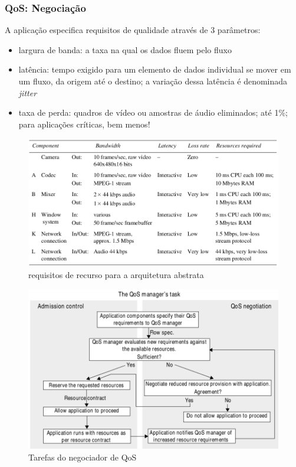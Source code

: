 \documentclass[]{beamer}
\begin{document}
\begin{frame}
  \frametitle{QoS: Negociação}
A aplicação especifica requisitos de qualidade através de 3 parâmetros: 
\begin{itemize}
  \item largura de banda: a taxa na qual os dados fluem pelo fluxo
  \item latência: tempo exigido para um elemento de dados individual se mover
em um fluxo, da origem até o destino; a variação dessa latência é denominada \emph{jitter}
  \item taxa de perda: quadros de vídeo ou amostras de áudio eliminados; até 1\%; 
para aplicações críticas, bem menos!
\end{itemize}
\end{frame}

\begin{frame}

  \begin{figure}[hbtp]
   \caption{requisitos de recurso para a arquitetura abstrata}
   \begin{center}
    \includegraphics[scale=0.33]{requisitos_recursos.png}
   \end{center}
  \end{figure}
\end{frame}

\begin{frame}
  \begin{figure}[hbtp]
   \caption{Tarefas do negociador de QoS}
   \begin{center}
    \includegraphics[scale=0.33]{negociador_qos.png}
   \end{center}
  \end{figure}
\end{frame}
\end{document}
